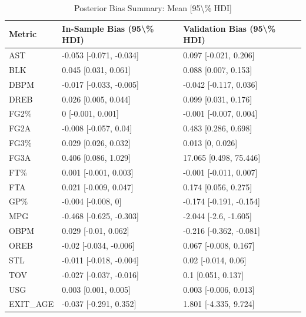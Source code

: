 \begin{table}[t]
\caption*{
{\fontsize{20}{25}\selectfont  Posterior Bias Summary: Mean [95\textbackslash{}\% HDI]\fontsize{12}{15}\selectfont }
} 
\fontsize{12.0pt}{14.0pt}\selectfont
\begin{tabular*}{\linewidth}{@{\extracolsep{\fill}}lll}
\toprule
Metric & In-Sample Bias (95\textbackslash{}\% HDI) & Validation Bias (95\textbackslash{}\% HDI) \\ 
\midrule\addlinespace[2.5pt]
AST & -0.053 [-0.071, -0.034] & 0.097 [-0.021, 0.206] \\ 
BLK & 0.045 [0.031, 0.061] & 0.088 [0.007, 0.153] \\ 
DBPM & -0.017 [-0.033, -0.005] & -0.042 [-0.117, 0.036] \\ 
DREB & 0.026 [0.005, 0.044] & 0.099 [0.031, 0.176] \\ 
FG2\% & 0 [-0.001, 0.001] & -0.001 [-0.007, 0.004] \\ 
FG2A & -0.008 [-0.057, 0.04] & 0.483 [0.286, 0.698] \\ 
FG3\% & 0.029 [0.026, 0.032] & 0.013 [0, 0.026] \\ 
FG3A & 0.406 [0.086, 1.029] & 17.065 [0.498, 75.446] \\ 
FT\% & 0.001 [-0.001, 0.003] & -0.001 [-0.011, 0.007] \\ 
FTA & 0.021 [-0.009, 0.047] & 0.174 [0.056, 0.275] \\ 
GP\% & -0.004 [-0.008, 0] & -0.174 [-0.191, -0.154] \\ 
MPG & -0.468 [-0.625, -0.303] & -2.044 [-2.6, -1.605] \\ 
OBPM & 0.029 [-0.01, 0.062] & -0.216 [-0.362, -0.081] \\ 
OREB & -0.02 [-0.034, -0.006] & 0.067 [-0.008, 0.167] \\ 
STL & -0.011 [-0.018, -0.004] & 0.02 [-0.014, 0.06] \\ 
TOV & -0.027 [-0.037, -0.016] & 0.1 [0.051, 0.137] \\ 
USG & 0.003 [0.001, 0.005] & 0.003 [-0.006, 0.013] \\ 
EXIT\_AGE & -0.037 [-0.291, 0.352] & 1.801 [-4.335, 9.724] \\ 
\bottomrule
\end{tabular*}
\end{table}

